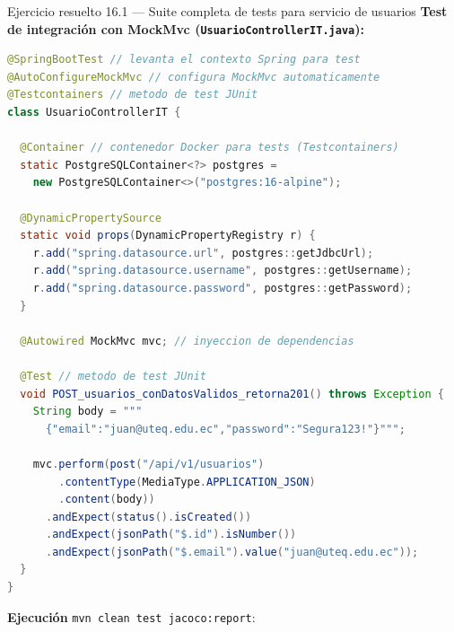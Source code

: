 \begin{cajaejemplo}{Ejercicio resuelto 16.1 --- Suite completa de tests para servicio de usuarios}
\textbf{Test de integración con MockMvc (\texttt{UsuarioControllerIT.java}):}
\begin{lstlisting}[language=Java,caption={Integración con MockMvc},label=lst:16.9]
@SpringBootTest // levanta el contexto Spring para test
@AutoConfigureMockMvc // configura MockMvc automaticamente
@Testcontainers // metodo de test JUnit
class UsuarioControllerIT {

  @Container // contenedor Docker para tests (Testcontainers)
  static PostgreSQLContainer<?> postgres =
    new PostgreSQLContainer<>("postgres:16-alpine");

  @DynamicPropertySource
  static void props(DynamicPropertyRegistry r) {
    r.add("spring.datasource.url", postgres::getJdbcUrl);
    r.add("spring.datasource.username", postgres::getUsername);
    r.add("spring.datasource.password", postgres::getPassword);
  }

  @Autowired MockMvc mvc; // inyeccion de dependencias

  @Test // metodo de test JUnit
  void POST_usuarios_conDatosValidos_retorna201() throws Exception {
    String body = """
      {"email":"juan@uteq.edu.ec","password":"Segura123!"}""";

    mvc.perform(post("/api/v1/usuarios")
        .contentType(MediaType.APPLICATION_JSON)
        .content(body))
      .andExpect(status().isCreated())
      .andExpect(jsonPath("$.id").isNumber())
      .andExpect(jsonPath("$.email").value("juan@uteq.edu.ec"));
  }
}
\end{lstlisting}

\textbf{Ejecución} \texttt{mvn clean test jacoco:report}:

\begin{center}
\end{center}


\end{cajaejemplo}
